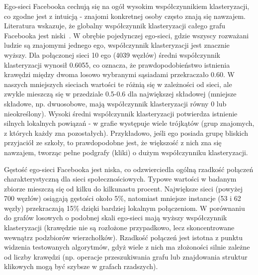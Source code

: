 Ego-sieci Facebooka cechują się na ogół wysokim współczynnikiem klasteryzacji, co zgodne jest z intuicją - znajomi konkretnej osoby często znają się nawzajem. Literatura wskazuje, że globalny współczynnik klasteryzacji całego grafu Facebooka jest niski~\cite{Ugander2011}. W obrębie pojedynczej ego-sieci, gdzie wszyscy rozważani ludzie są znajomymi jednego ego, współczynnik klasteryzacji jest znacznie wyższy. Dla połączonej sieci 10 ego (4039 węzłów) średni współczynnik klasteryzacji wynosił 0.6055, co oznacza, że prawdopodobieństwo istnienia krawędzi między dwoma losowo wybranymi sąsiadami przekraczało 0.60. W naszych mniejszych sieciach wartości te różnią się w zależności od sieci, ale zwykle mieszczą się w przedziale 0.5-0.6 dla największej składowej (mniejsze składowe, np. dwuosobowe, mają współczynnik klasteryzacji równy 0 lub nieokreślony). Wysoki średni współczynnik klasteryzacji potwierdza istnienie silnych lokalnych powiązań - w grafie występuje wiele trójkątów (grup znajomych, z których każdy zna pozostałych). Przykładowo, jeśli ego posiada grupę bliskich przyjaciół ze szkoły, to prawdopodobne jest, że większość z nich zna się nawzajem, tworząc pełne podgrafy (kliki) o dużym współczynniku klasteryzacji.

Gęstość ego-sieci Facebooka jest niska, co odzwierciedla ogólną rzadkość połączeń charakterystyczną dla sieci społecznościowych. Typowe wartości w badanym zbiorze mieszczą się od kilku do kilkunastu procent. Największe sieci (powyżej 700 węzłów) osiągają gęstości około 5\%, natomiast mniejsze instancje (53 i 62 węzły) przekraczają 15\% dzięki bardziej lokalnym połączeniom. W porównaniu do grafów losowych o podobnej skali ego-sieci mają wyższy współczynnik klasteryzacji (krawędzie nie są rozłożone przypadkowo, lecz skoncentrowane wewnątrz podzbiorów wierzchołków). Rzadkość połączeń jest istotna z punktu widzenia testowanych algorytmów, gdyż wiele z nich ma złożoności silnie zależne od liczby krawędzi (np. operacje przeszukiwania grafu lub znajdowania struktur klikowych mogą być szybsze w grafach rzadszych).
